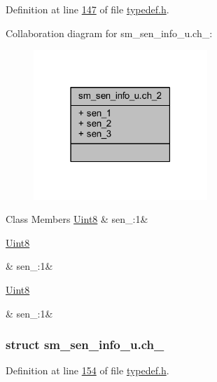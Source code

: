 Definition at line \hyperlink{a00001_source_l00147}{147} of file \hyperlink{a00001_source}{typedef.\+h}.



Collaboration diagram for sm\+\_\+sen\+\_\+info\+\_\+u.\+ch\+\_\+:
\nopagebreak
\begin{figure}[H]
\begin{center}
\leavevmode
\includegraphics[width=186pt]{d0/d3e/a00253}
\end{center}
\end{figure}
\begin{DoxyFields}{Class Members}
\hypertarget{a00001_a226219dc5b8b7d5e5d1e7cf59aff4981}{\hyperlink{a00001_a979e3e23b9a449e69ab6a8a83b6042f8}{Uint8}}\label{a00001_a226219dc5b8b7d5e5d1e7cf59aff4981}
&
sen\+\_\+:1&
\\
\hline

\hypertarget{a00001_a7111d63086b336f186d5c29829ed8852}{\hyperlink{a00001_a979e3e23b9a449e69ab6a8a83b6042f8}{Uint8}}\label{a00001_a7111d63086b336f186d5c29829ed8852}
&
sen\+\_\+:1&
\\
\hline

\hypertarget{a00001_a25b93705f9c83a019eb4874d5e07cafd}{\hyperlink{a00001_a979e3e23b9a449e69ab6a8a83b6042f8}{Uint8}}\label{a00001_a25b93705f9c83a019eb4874d5e07cafd}
&
sen\+\_\+:1&
\\
\hline

\end{DoxyFields}
\label{d7/d06/a00131}
\hypertarget{a00001_d7/d06/a00131}{}
\subsubsection{struct sm\+\_\+sen\+\_\+info\+\_\+u.\+ch\+\_}


Definition at line \hyperlink{a00001_source_l00154}{154} of file \hyperlink{a00001_source}{typedef.\+h}.



